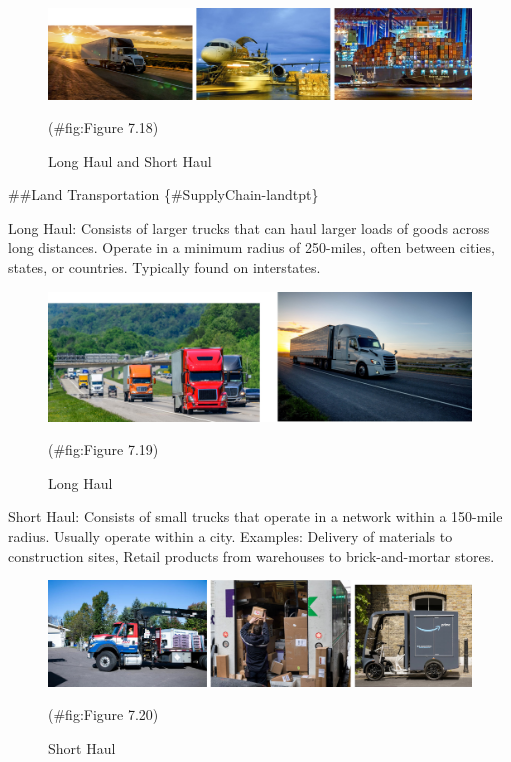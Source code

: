 \documentclass[
]{book}
\begin{document}
\begin{figure}

{\centering \includegraphics{./Images/supplychain/Long Haul and Short Haul} 

}

\caption{Long Haul and Short Haul}(\#fig:Figure 7.18)
\end{figure}

\#\#Land Transportation \{\#SupplyChain-landtpt\}

Long Haul:
Consists of larger trucks that can haul larger loads of goods across long distances.
Operate in a minimum radius of 250-miles, often between cities, states, or countries.
Typically found on interstates.

\begin{figure}

{\centering \includegraphics{./Images/supplychain/Long Haul} 

}

\caption{Long Haul}(\#fig:Figure 7.19)
\end{figure}

Short Haul:
Consists of small trucks that operate in a network within a 150-mile radius.
Usually operate within a city.
Examples: Delivery of materials to construction sites, Retail products from warehouses to brick-and-mortar stores.

\begin{figure}

{\centering \includegraphics{./Images/supplychain/Short Haul} 

}

\caption{Short Haul}(\#fig:Figure 7.20)
\end{figure}
\end{document}
